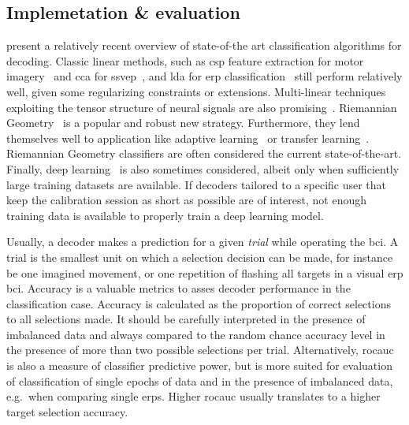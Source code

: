 \subsection{Implemetation \& evaluation}

\textcite{Lotte2018, Xu2021} present a relatively recent overview of state-of-the art
classification algorithms for decoding.
Classic linear methods, such as \ac{csp} feature extraction for
motor imagery~\cite{Park2017} and \ac{cca} for \ac{ssvep}~\cite{Nakanishi2017},
and \ac{lda} for \ac{erp} classification~\cite{Sosulski2022} still perform
relatively well, given some regularizing constraints or extensions.
Multi-linear techniques exploiting the tensor structure of neural signals are
also promising~\cite{Lotte2018}.
Riemannian Geometry~\cite{Barachant2014} is a popular and robust new strategy.
Furthermore, they lend themselves well to application like adaptive
learning~\cite{Benaroch2021} or transfer learning~\cite{Zanini2017}.
Riemannian Geometry classifiers are often considered the current
state-of-the-art.
Finally, deep learning~\cite{Bhuvaneshwari2021} is also sometimes considered,
albeit only when sufficiently large training datasets are available.
If decoders tailored to a specific user that keep the calibration session as
short as possible are of interest, not enough training data is available to
properly train a deep learning model.

Usually, a decoder makes a prediction for a given \emph{trial} while operating
the \ac{bci}.
A trial is the smallest unit on which a selection decision can be made, for
instance be one imagined movement, or one repetition of flashing all targets
in a visual \ac{erp} \ac{bci}.
Accuracy is a valuable metrics to asses decoder performance in the classification
case.
Accuracy is calculated as the proportion of correct selections to all
selections made.
It should be carefully interpreted in the presence of imbalanced data and always compared to the
random chance accuracy level in the presence of more than two possible
selections per trial.
Alternatively, \ac{rocauc} is also a measure of classifier predictive power, but is more
suited for evaluation of classification of single epochs of data and in the
presence of imbalanced data, e.g.\ when comparing single \acp{erp}.
Higher \ac{rocauc} usually translates to a higher target selection accuracy.

